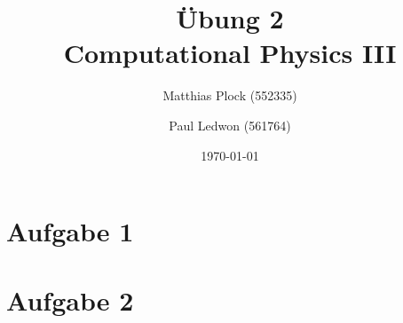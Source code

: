 \documentclass[10pt,a4paper]{article}
\title{Übung 2 \\Computational Physics III}
\author{Matthias Plock (552335) \and Paul Ledwon (561764)}
\date{\today}
\begin{document}
\maketitle
\tableofcontents

\pagestyle{myheadings}                  %

\section{Aufgabe 1}

\section{Aufgabe 2}
\end{document}
